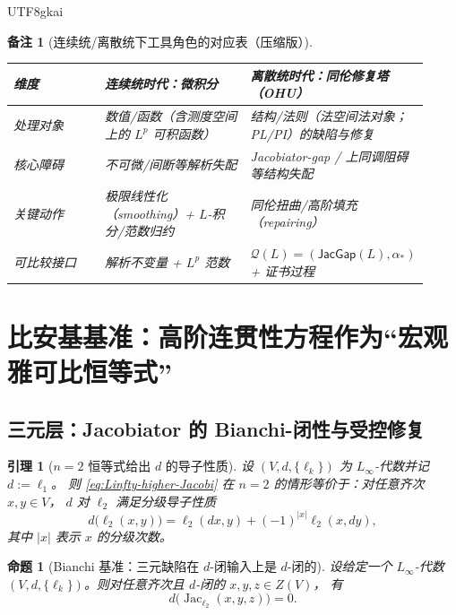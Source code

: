 \documentclass[12pt]{article}
\newtheorem{proposition}{命题}[section]
\newtheorem{lemma}{引理}[section]
\newtheorem{remark}{备注}[section]
\newcommand{\Layer}{\ensuremath{\ell}}
\newcommand{\Jac}{\operatorname{Jac}}
\newcommand{\JacGap}{\ensuremath{\mathsf{JacGap}}}
\begin{document}
\begin{CJK*}{UTF8}{gkai}
\begin{remark}[连续统/离散统下工具角色的对应表（压缩版）]
\mbox{}\par
\begin{center}
{\small
\setlength{\tabcolsep}{3pt}
\renewcommand{\arraystretch}{1.25}
\begin{tabular}{|p{0.22\linewidth}|p{0.35\linewidth}|p{0.35\linewidth}|}
\hline
维度 &
连续统时代：微积分 &
离散统时代：同伦修复塔（OHU）\\
\hline
处理对象 &
数值/函数（含测度空间上的 $L^p$ 可积函数） &
结构/法则（法空间法对象；PL/PI）的缺陷与修复\\
\hline
核心障碍 &
不可微/间断等解析失配 &
Jacobiator-gap / 上同调阻碍等结构失配\\
\hline
关键动作 &
极限线性化（smoothing）+ $L$-积分/范数归约 &
同伦扭曲/高阶填充（repairing）\\
\hline
可比较接口 &
解析不变量 + $L^p$ 范数 &
$\mathcal{Q}(L)=(\JacGap(L),\alpha_\ast)$ + 证书过程\\
\hline
\end{tabular}
}
\end{center}
\end{remark}

\section{比安基基准：高阶连贯性方程作为“宏观雅可比恒等式”}
\label{sec:bianchi-benchmark}

\subsection{三元层：Jacobiator 的 Bianchi-闭性与受控修复}

\begin{lemma}[$n=2$ 恒等式给出 $d$ 的导子性质]
\label{lem:n2-derivation}
设 $(V,d,\{\Layer_k\})$ 为 $L_\infty$-代数并记 $d:=\Layer_1$。
则 \eqref{eq:Linfty-higher-Jacobi} 在 $n=2$ 的情形等价于：对任意齐次 $x,y\in V$，
$d$ 对 $\Layer_2$ 满足分级导子性质
\[
  d\bigl(\Layer_2(x,y)\bigr)
  =
  \Layer_2(dx,y)
  +(-1)^{|x|}\Layer_2(x,dy),
\]
其中 $|x|$ 表示 $x$ 的分级次数。
\end{lemma}

\begin{proposition}[Bianchi 基准：三元缺陷在 $d$-闭输入上是 $d$-闭的]
\label{prop:bianchi-arity3-closed}
设给定一个 $L_\infty$-代数 $(V,d,\{\Layer_k\})$。则对任意齐次且 $d$-闭的 $x,y,z\in Z(V)$，
有
\[
  d\bigl(\Jac_{\Layer_2}(x,y,z)\bigr)=0.
\]
\end{proposition}


\end{CJK*}
\end{document}
